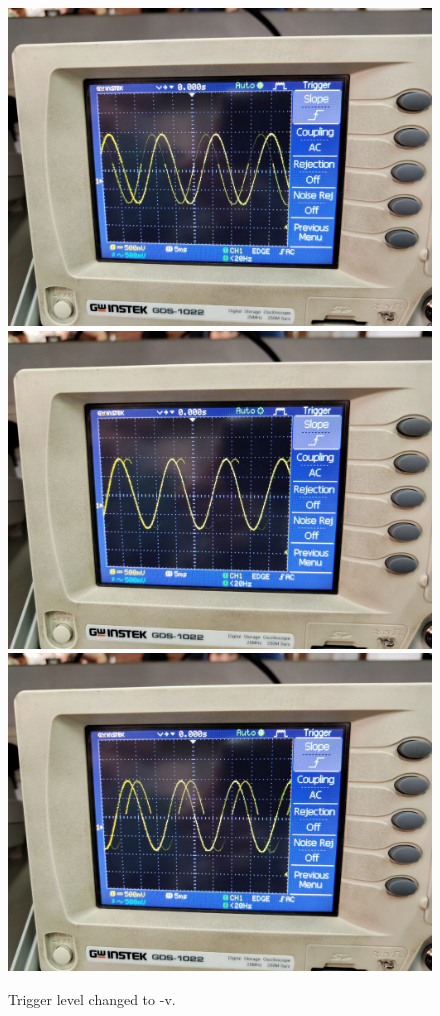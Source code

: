 \documentclass[11pt]{article}
\begin{document}
\begin{question}
{        \begin{figure}[H]
            \begin{center}
                \includegraphics[scale=0.1]{Fig/49.jpeg}
                \includegraphics[scale=0.1]{Fig/50.jpeg}
                \includegraphics[scale=0.1]{Fig/51.jpeg}
                \caption{Trigger level changed to -v.}
            \end{center}
        \end{figure}

}
\end{question}
\end{document}
